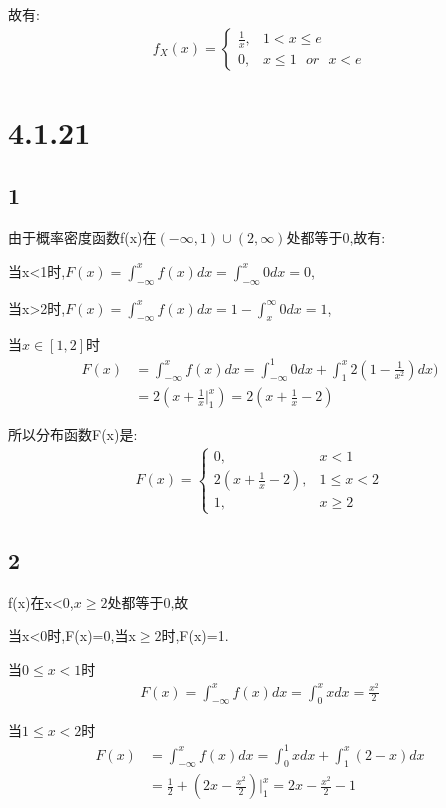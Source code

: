 \documentclass[12pt,a4paper,fontset=none]{ctexart}
\begin{document}
故有:
\begin{align*}
    f_X(x)=
    \begin{cases}
        \frac{1}{x}, & \text{} 1<x\leqslant e                       \\
        0,           & \text{} x\leqslant 1\text{ } or\text{ } x< e
    \end{cases}
\end{align*}
\section*{4.1.21}
\subsection*{1}
由于概率密度函数f(x)在$(-\infty,1)\cup (2,\infty)$处都等于0,故有:

当x<1时,$F(x)=\int_{-\infty}^{x}f(x)dx =\int_{-\infty}^{x}  0dx =0$,

当x>2时,$F(x)=\int_{-\infty}^{x}f(x)dx =1-\int_{x}^{\infty}  0dx =1$,

当$x\in [1,2]$时
\begin{align*}
    F(x) & =\int_{-\infty}^{x}f(x)dx=\int_{-\infty}^{1}0dx+\int_{1}^{x} 2(1-\frac{1}{x^2})dx ) \\
         & =2(x+\frac{1}{x}\bigg|_{1}^x )=2(x+\frac{1}{x}-2 )
\end{align*}

所以分布函数F(x)是:
\begin{align*}
    F(x)=
    \begin{cases}
        0,                   & \text{} x<1             \\
        2(x+\frac{1}{x}-2 ), & \text{} 1\leqslant x <2 \\
        1,                   & \text{} x\geqslant 2
    \end{cases}
\end{align*}
\subsection*{2}
f(x)在x<0,$x\geqslant 2$处都等于0,故

当x<0时,F(x)=0,当x$\geqslant 2$时,F(x)=1.

当$0\leqslant x <1$时
\begin{align*}
    F(x)=\int_{-\infty}^{x} f(x)dx=\int_{0}^{x}x dx=\frac{x^2}{2}
\end{align*}

当$1\leqslant x<2$时
\begin{align*}
    F(x) & =\int_{-\infty}^{x}f(x)dx=\int_{0}^{1}x dx +\int_{1}^{x}(2-x)dx \\
         & =\frac{1}{2}+(2x-\frac{x^2}{2} )\bigg|_1^x=2x-\frac{x^2}{2}-1
\end{align*}
\end{document}
